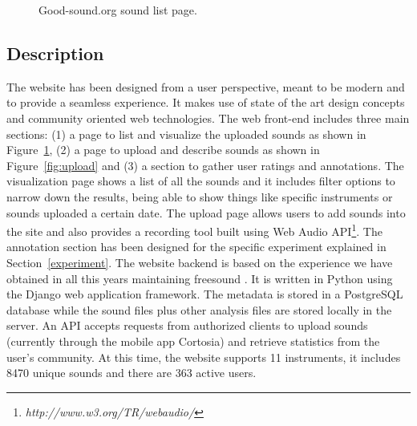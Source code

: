 \documentclass{article}
\begin{document}
\begin{figure}[ht]
 \centerline{}
 \caption{Good-sound.org sound list page.}
 \label{fig:sound_list}
\end{figure}

\subsection{Description} 
The website has been designed from a user perspective, meant to be modern and to provide a seamless experience. It makes use of state of the art design concepts and community oriented web technologies. The web front-end includes three main sections: (1) a page to list and visua\-lize the uploaded sounds as shown in Figure~\ref{fig:sound_list}, (2) a page to upload and describe sounds as shown in Figure~\ref{fig:upload} and (3) a section to gather user ratings and annotations. The visualization page shows a list of all the sounds and it includes filter options to narrow down the results, being able to show things like specific instruments or sounds uploaded a certain date. The upload page allows users to add sounds into the site and also provides a recording tool built using Web Audio API\footnote{\textit{http://www.w3.org/TR/webaudio/}}. The annotation section has been designed for the specific experiment explained in Section~\ref{experiment}. 
The website backend is based on the experience we have obtained in all this years maintaining freesound\cite{2} . It is written in Python using the Django web application framework. The metadata is stored in a PostgreSQL database while the sound files plus other analysis files are stored locally in the server. An API accepts requests from authorized clients to upload sounds (currently through the mobile app Cortosia) and retrieve statistics from the user’s community. At this time, the website supports 11 instruments, it includes 8470 unique sounds and there are 363 active users. 
\end{document}
